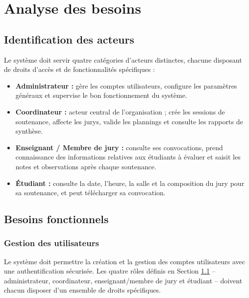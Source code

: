 \documentclass[12pt,a4paper]{article}
\begin{document}
\section{Analyse des besoins}
\label{sec:besoins}

\subsection{Identification des acteurs}
\label{subsec:acteurs}

Le système doit servir quatre catégories d'acteurs distinctes, chacune disposant
de droits d'accès et de fonctionnalités spécifiques :

\begin{itemize}[label=\textcolor{primary}{\textbullet}]
    \item \textbf{Administrateur :} gère les comptes utilisateurs, configure les
          paramètres généraux et supervise le bon fonctionnement du système.
    \item \textbf{Coordinateur :} acteur central de l'organisation ; crée les
          sessions de soutenance, affecte les jurys, valide les plannings et
          consulte les rapports de synthèse.
    \item \textbf{Enseignant / Membre de jury :} consulte ses convocations,
          prend connaissance des informations relatives aux étudiants à évaluer
          et saisit les notes et observations après chaque soutenance.
    \item \textbf{Étudiant :} consulte la date, l'heure, la salle et la
          composition du jury pour sa soutenance, et peut télécharger sa
          convocation.
\end{itemize}

\subsection{Besoins fonctionnels}
\label{subsec:besoins_fonctionnels}

\subsubsection{Gestion des utilisateurs}
\label{subsubsec:gestion_utilisateurs}

Le système doit permettre la création et la gestion des comptes utilisateurs
avec une authentification sécurisée. Les quatre rôles définis en Section
\ref{subsec:acteurs} -- administrateur, coordinateur, enseignant/membre de jury
et étudiant -- doivent chacun disposer d'un ensemble de droits spécifiques.
\end{document}
